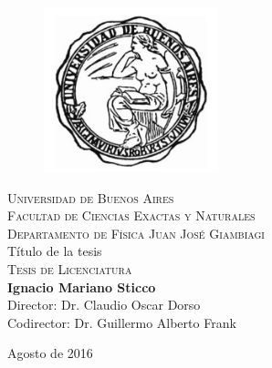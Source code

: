 \thispagestyle{empty}

\begin{center}

 \begin{figure}[htb]
\centering
\includegraphics[width=0.45\textwidth]{caratula/logo.png}
\end{figure} 



\textsc{\LARGE Universidad de Buenos Aires}\\[0.5cm]
\textsc{\large Facultad de Ciencias Exactas y Naturales}\\[0.5cm]

\textsc{  Departamento de Física Juan José Giambiagi}\\[0.5cm]


\huge Título de la tesis\\

\textsc{\large Tesis de Licenciatura}\\[1cm]

{\LARGE \textbf{
Ignacio Mariano Sticco}} \\ [1cm]

\large
Director: Dr. Claudio Oscar Dorso \\[0.5cm]
Codirector: Dr. Guillermo Alberto Frank
\vfill


 Agosto de 2016

\end{center}

\newpage


